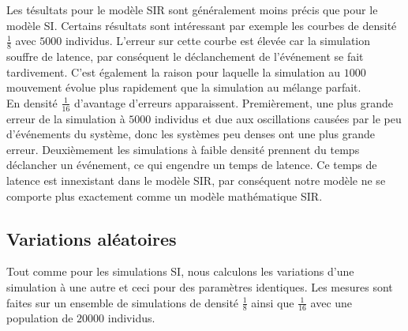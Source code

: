 Les tésultats pour le modèle SIR sont généralement moins précis que pour le modèle SI. Certains résultats sont intéressant par exemple les courbes de densité $\frac{1}{8}$ avec $5000$ individus. L'erreur sur cette courbe est élevée car la simulation souffre de latence, par conséquent le déclanchement de l'événement se fait tardivement. C'est également la raison pour laquelle la simulation au $1000$ mouvement évolue plus rapidement que la simulation au mélange parfait.\\

En densité $\frac{1}{16}$ d'avantage d'erreurs apparaissent. Premièrement, une plus grande erreur de la simulation à $5000$ individus et due aux oscillations causées par le peu d'événements du système, donc les systèmes peu denses ont une plus grande erreur. Deuxièmement les simulations à faible densité prennent du temps déclancher un événement, ce qui engendre un temps de latence. Ce temps de latence est innexistant dans le modèle SIR, par conséquent notre modèle ne se comporte plus exactement comme un modèle mathématique SIR.

\newpage

\subsection{Variations aléatoires}

Tout comme pour les simulations SI, nous calculons les variations d'une simulation à une autre et ceci pour des paramètres identiques. Les mesures sont faites sur un ensemble de simulations de densité $\frac{1}{8}$ ainsi que $\frac{1}{16}$ avec une population de $20000$ individus.

